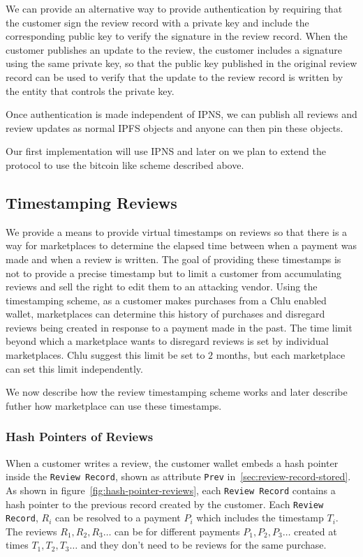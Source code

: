 \documentclass[a4paper]{article}
\begin{document}
We can provide an alternative way to provide authentication by
requiring that the customer sign the review record with a private key
and include the corresponding public key to verify the signature in
the review record. When the customer publishes an update to the
review, the customer includes a signature using the same private key,
so that the public key published in the original review record can be
used to verify that the update to the review record is written by the
entity that controls the private key.

Once authentication is made independent of IPNS, we can publish all
reviews and review updates as normal IPFS objects and anyone can then
pin these objects.

Our first implementation will use IPNS and later on we plan to extend
the protocol to use the bitcoin like scheme described above.

\subsection{Timestamping Reviews}\label{sec:timestamping-reviews}

We provide a means to provide virtual timestamps on reviews so that
there is a way for marketplaces to determine the elapsed time between
when a payment was made and when a review is written. The goal of
providing these timestamps is not to provide a precise timestamp but
to limit a customer from accumulating reviews and sell the right to
edit them to an attacking vendor. Using the timestamping scheme, as a
customer makes purchases from a Chlu enabled wallet, marketplaces can
determine this history of purchases and disregard reviews being
created in response to a payment made in the past. The time limit
beyond which a marketplace wants to disregard reviews is set by
individual marketplaces. Chlu suggest this limit be set to $2$ months,
but each marketplace can set this limit independently.

We now describe how the review timestamping scheme works and later
describe futher how marketplace can use these timestamps.

\subsubsection{Hash Pointers of Reviews}

When a customer writes a review, the customer wallet embeds a hash
pointer inside the \texttt{Review Record}, shown as attribute
\texttt{Prev} in~\ref{sec:review-record-stored}. As shown in
figure~\ref{fig:hash-pointer-reviews}, each \texttt{Review Record}
contains a hash pointer to the previous record created by the
customer. Each \texttt{Review Record}, $R_i$ can be resolved to a
payment $P_i$ which includes the timestamp $T_i$. The reviews
$R_1, R_2, R_3 \ldots$ can be for different payments
$P_1, P_2, P_3 \ldots$ created at times $T_1, T_2, T_3 \ldots$ and
they don't need to be reviews for the same purchase.
\end{document}
